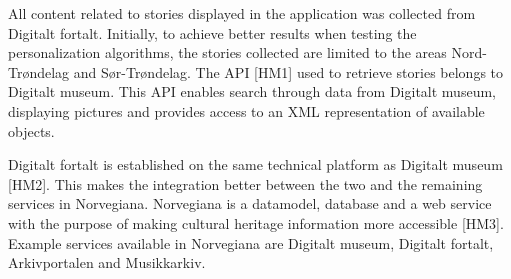 All content related to stories displayed in the application was collected from Digitalt fortalt. Initially, to achieve better results when testing the personalization algorithms, the stories collected are limited to the areas Nord-Trøndelag and Sør-Trøndelag. The API [HM1] used to retrieve stories belongs to Digitalt museum. This API enables search through data from Digitalt museum, displaying pictures and provides access to an XML representation of available objects.\newline

Digitalt fortalt is established on the same technical platform as Digitalt museum [HM2]. This makes the integration better between the two and the remaining services in Norvegiana. Norvegiana is a datamodel, database and a web service with the purpose of making cultural heritage information more accessible [HM3]. Example services available in Norvegiana are Digitalt museum, Digitalt fortalt, Arkivportalen and Musikkarkiv. 

\cleardoublepage